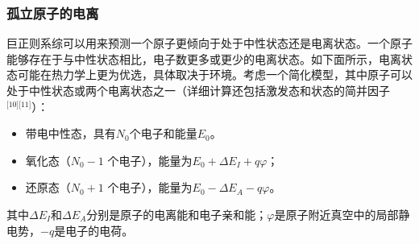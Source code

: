 \subsubsection{孤立原子的电离}
巨正则系综可以用来预测一个原子更倾向于处于中性状态还是电离状态。一个原子能够存在于与中性状态相比，电子数更多或更少的电离状态。如下面所示，电离状态可能在热力学上更为优选，具体取决于环境。考虑一个简化模型，其中原子可以处于中性状态或两个电离状态之一（详细计算还包括激发态和状态的简并因子\(^\text{[10][11]}\)）：
\begin{itemize}
\item 带电中性态，具有\( N_0 \)个电子和能量\( E_0 \)。
\item 氧化态（\( N_0 - 1 \) 个电子），能量为\( E_0 + \Delta E_I + q\varphi \)；
\item 还原态（\( N_0 + 1 \) 个电子），能量为\( E_0 - \Delta E_A - q\varphi \)。
\end{itemize}
其中\( \Delta E_I \)和\( \Delta E_A \)分别是原子的电离能和电子亲和能；\( \varphi \)是原子附近真空中的局部静电势，\( -q \)是电子的电荷。